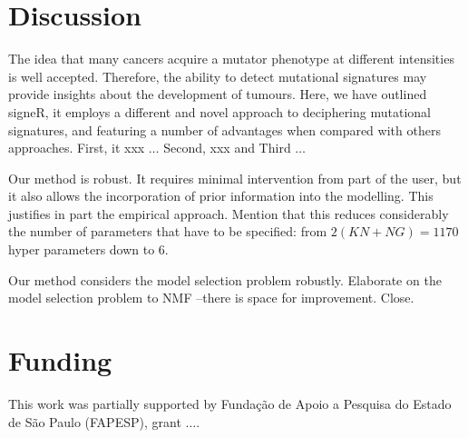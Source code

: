 \documentclass{bioinfo}
\begin{document}
\section{Discussion}
The idea that many cancers acquire a mutator phenotype at different 
intensities is well accepted. Therefore, the ability to detect 
mutational signatures may provide insights about the development of
tumours. Here, we have outlined signeR, it employs a different and 
novel approach to deciphering mutational signatures, and featuring a
number of advantages when compared with others approaches. First, it
xxx $\ldots$ Second, xxx and Third $\ldots$ 


Our method is robust. It requires minimal intervention from part of
the user, but it also allows the incorporation of prior information
into the modelling. This justifies in part the empirical
approach. Mention that this reduces considerably the number of
parameters that have to be specified: from $2(KN+NG)=1170$ hyper
parameters down to 6.


Our method considers the model selection problem robustly. Elaborate
on the model selection problem to NMF --there is space for
improvement. Close.

\section*{Funding}
This work was partially supported by Funda\c{c}\~ao de Apoio a
Pesquisa do Estado de S\~ao Paulo (FAPESP), grant $\ldots$. 
\vspace*{-12pt}


 

\end{document}
